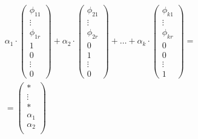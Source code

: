 \documentclass[a4paper,12pt]{article}
\begin{document}
    \begin{align*}
        &\alpha_1\cdot\begin{pmatrix}
                          \phi_{11} \\
                          \vdots    \\
                          \phi_{1r} \\
                          1         \\
                          0         \\
                          \vdots    \\
                          0
        \end{pmatrix}+\alpha_2\cdot\begin{pmatrix}
                                       \phi_{21} \\
                                       \vdots    \\
                                       \phi_{2r} \\
                                       0         \\
                                       1         \\
                                       \vdots    \\
                                       0
        \end{pmatrix}+\ldots+\alpha_k\cdot\begin{pmatrix}
                                              \phi_{k1} \\
                                              \vdots    \\
                                              \phi_{kr} \\
                                              0         \\
                                              0         \\
                                              \vdots    \\
                                              1
        \end{pmatrix}=\\
        &=\begin{pmatrix}
              *        \\
              \vdots\\
              *        \\
              \alpha_1 \\
              \alpha_2 \\

\end{pmatrix}
\end{align*}
\end{document}
